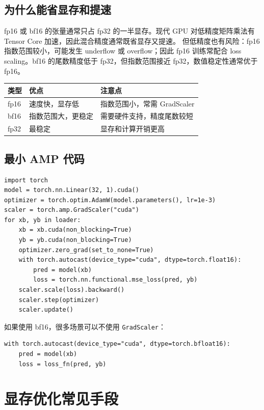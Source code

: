 \subsection{为什么能省显存和提速}
fp16 或 bf16 的张量通常只占 fp32 的一半显存。现代 GPU 对低精度矩阵乘法有 Tensor Core 加速，因此混合精度通常既省显存又提速。
但低精度也有风险：fp16 指数范围较小，可能发生 underflow 或 overflow；因此 fp16 训练常配合 loss scaling。bf16 的尾数精度低于 fp32，但指数范围接近 fp32，数值稳定性通常优于 fp16。
\begin{table}[htbp]
  \centering
  \begin{tabular}{lll}
    \toprule
    类型 & 优点 & 注意点 \\
    \midrule
    fp16 & 速度快，显存低 & 指数范围小，常需 GradScaler \\
    bf16 & 指数范围大，更稳定 & 需要硬件支持，精度尾数较短 \\
    fp32 & 最稳定 & 显存和计算开销更高 \\
    \bottomrule
  \end{tabular}
\end{table}
\subsection{最小 AMP 代码}
\begin{lstlisting}
import torch
model = torch.nn.Linear(32, 1).cuda()
optimizer = torch.optim.AdamW(model.parameters(), lr=1e-3)
scaler = torch.amp.GradScaler("cuda")
for xb, yb in loader:
    xb = xb.cuda(non_blocking=True)
    yb = yb.cuda(non_blocking=True)
    optimizer.zero_grad(set_to_none=True)
    with torch.autocast(device_type="cuda", dtype=torch.float16):
        pred = model(xb)
        loss = torch.nn.functional.mse_loss(pred, yb)
    scaler.scale(loss).backward()
    scaler.step(optimizer)
    scaler.update()
\end{lstlisting}
如果使用 bf16，很多场景可以不使用 \texttt{GradScaler}：
\begin{lstlisting}
with torch.autocast(device_type="cuda", dtype=torch.bfloat16):
    pred = model(xb)
    loss = loss_fn(pred, yb)
\end{lstlisting}
\section{显存优化常见手段}
